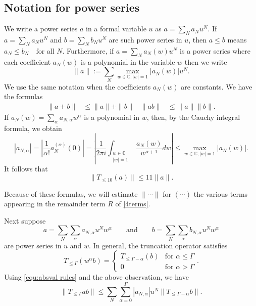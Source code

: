 \documentclass[12pt]{amsart}
\theoremstyle{definition}
\numberwithin{equation}{section}
\newcommand{\cc}{\mathbb{C}}
\theoremstyle{definition} %
\theoremstyle{remark}
\begin{document}
\subsection{Notation for power series} 
We write a power series $a$ in a formal variable $u$ as $a = \sum_{N} a_N u^N$. If $a=\sum_N a_N u^N$ and $b=\sum_N b_N u^N$ are such power series in $u$, then 
$
a\leq b
$ 
means 
$
a_N\leq b_N \quad \text{for all $N$.}
$ 
Furthermore, if $a=\sum_N a_N(w) u^N$ is a power series where each coefficient $a_N(w)$ is a polynomial in the variable $w$ then we write 
\[
\| a\| := \sum_N \max_{w\in \mathbb C, |w|=1}|a_N(w)| u^N.
\]
We use the same notation when the coefficients  $a_N(w)$ are constants.
We have the formulas 
\begin{align}
    \label{equ:absval rules}
    \|a+b\|&\leq \| a\| + \| b\|
    &
    \| a b\| &\leq  \| a\| \| b\|.
\end{align}
If $a_N(w)  = \sum_{\alpha} a_{N, \alpha} w^\alpha$ is a polynomial in $w$, then, 
 by the Cauchy integral formula, we obtain
 \[|a_{N,\alpha}| = \left|\frac{1}{\alpha!} a_N^{(\alpha)}(0) \right| = \left| \frac{1}{2\pi i} \int_{\substack{w \in \cc \\ |w| = 1}} \frac{a_N(w)}{w^{\alpha+1}} dw \right| \leq \max_{w \in \cc, |w| = 1}|a_N(w)|.\]
It follows that
\begin{equation}
    \label{equ:T ab cheap}
\|T_{\leq 10}(a) \|\leq 
11 \|a\|.
\end{equation}

Because of these formulas, we will estimate $\|\cdots\|$ for $(\cdots)$ the various terms appearing in the remainder term $R$ of \eqref{4terms}.

Next suppose
\[
a = \sum_N \sum_\alpha a_{N,\alpha} u^N w^\alpha 
\quad \quad \mbox{and} \quad \quad
b = \sum_N \sum_\alpha b_{N,\alpha} u^N w^\alpha 
\]
are power series in $u$ and $w$.
In general, the truncation operator satisfies 
\[
T_{\leq \Gamma} (w^\alpha b) = 
\begin{cases}
    T_{\leq \Gamma-\alpha} (b) &\text{for $\alpha\leq \Gamma$} \\
    0 &\text{for $\alpha>\Gamma$}
\end{cases}.
\]
Using \eqref{equ:absval rules} and the above observation,
we have 
\begin{equation}\label{equ:T ab}
\|T_{\leq\Gamma} ab\|
\leq 
\sum_N \sum_{\alpha=0}^\Gamma
|a_{N,\alpha}|u^N \|T_{\leq \Gamma-\alpha} b\|.
\end{equation}
\end{document}
